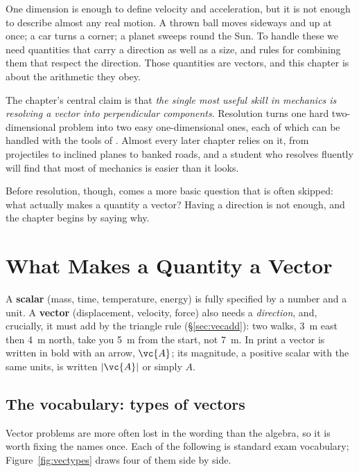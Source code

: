\label{ch:vectors}

One dimension is enough to define velocity and acceleration, but it is not enough to describe almost
any real motion. A thrown ball moves sideways and up at once; a car turns a corner; a planet sweeps
round the Sun. To handle these we need quantities that carry a direction as well as a size, and rules
for combining them that respect the direction. Those quantities are vectors, and this chapter is about
the arithmetic they obey.

The chapter's central claim is that \emph{the single most useful skill in mechanics is resolving a
vector into perpendicular components}. Resolution turns one
hard two-dimensional problem into two easy one-dimensional ones, each of which can be handled with the
tools of . Almost every later chapter relies on it, from projectiles to inclined planes to
banked roads, and a student who resolves fluently will find that most of mechanics is easier than it
looks.

Before resolution, though, comes a more basic question that is often skipped: what actually makes a
quantity a vector? Having a direction is not enough, and the chapter begins by saying why.

\section{What Makes a Quantity a Vector}

A \textbf{scalar} (mass, time, temperature, energy) is fully specified by a number and a unit. A
\textbf{vector} (displacement, velocity, force) also needs a \emph{direction}, and, crucially, it
must add by the triangle rule (\S\ref{sec:vecadd}): two walks, \SI{3}{m} east then \SI{4}{m} north, take
you \SI{5}{m} from the start, not \SI{7}{m}. In print a vector is written in
bold with an arrow, $\vc{A}$; its magnitude, a positive scalar with the same units, is written $|\vc{A}|$
or simply $A$.

\subsection{The vocabulary: types of vectors}

Vector problems are more often lost in the wording than the algebra, so it is worth fixing the names
once. Each of the following is standard exam vocabulary; Figure~\ref{fig:vectypes} draws four of them
side by side.

